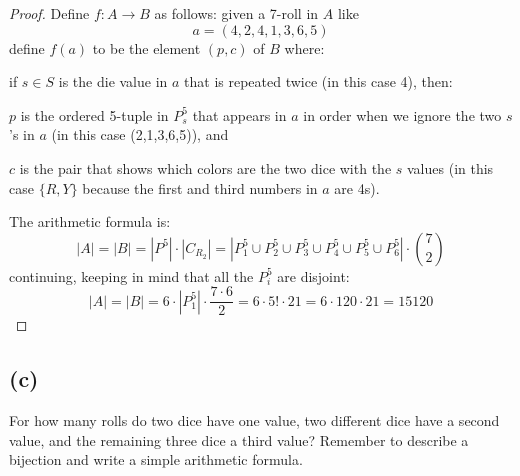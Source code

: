 \documentclass[14pt]{extarticle}
\begin{document}
\begin{proof}
Define $f: A \to B$ as follows: given a 7-roll in $A$ like 
$$
a = (4, 2, 4, 1, 3, 6, 5)
$$
define $f(a)$ to be the element $(p, c)$ of $B$ where:

if $s \in S$ is the die value in $a$ that is repeated twice (in this case 4), then:

$p$ is the ordered 5-tuple in $P_s^5$ that appears in $a$ in order when we ignore the two $s$'s in $a$ (in this case (2,1,3,6,5)), and 

$c$ is the pair that shows which colors are the two dice with the $s$ values (in this case $\{R,Y\}$ because the first and third numbers in $a$ are 4s).

The arithmetic formula is:
$$
|A| = |B| = |P^5|\cdot|C_{R_2}| = |P_1^5 \cup P_2^5 \cup P_3^5 \cup P_4^5 \cup P_5^5 \cup P_6^5| \cdot \binom{7}{2}
$$
continuing, keeping in mind that all the $P_i^5$ are disjoint:
$$
|A| = |B| = 6 \cdot |P_1^5| \cdot \frac{7 \cdot 6}{2} = 6 \cdot 5! \cdot 21 = 6 \cdot 120 \cdot 21 = 15120
$$
\end{proof}
\subsection{(c)}
For how many rolls do two dice have one value, two different dice have a second value, and the remaining three dice a third value? Remember to describe a bijection and write a simple arithmetic formula.
\end{document}
